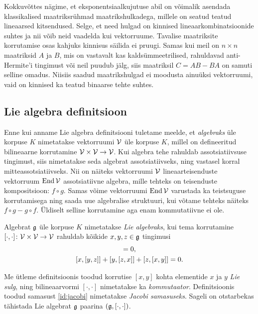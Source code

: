 Kokkuvõttes nägime, et eksponentsiaalkujutuse abil on võimalik asendada
klassikalised maatriksrühmad maatrikshulkadega, millele on seatud
teatud lineaarsed kitsendused. Selge, et need hulgad on kinnised
lineaarkombinatsioonide suhtes ja nii võib neid vaadelda kui vektorruume.
Tavalise maatriksite korrutamise osas kahjuks kinnisus säilida ei
pruugi. Samas kui meil on $n \times n$ maatriksid $A$ ja $B$, mis on vastavalt
kas kaldsümmeetrilised, rahuldavad anti-Hermite'i tingimust või neil
puudub jälg, siis maatriksil $C = AB - BA$ on samuti selline omadus.
Niisiis saadud maatrikshulgad ei moodusta ainuüksi vektorruumi,
vaid on kinnised ka teatud binaarse tehte suhtes.

\subsection{Lie algebra definitsioon}

Enne kui anname Lie algebra definitsiooni tuletame meelde, et \emph{algebraks}
üle korpuse $K$ nimetatakse vektorruumi $\mathcal{V}$ üle korpuse $K$, millel on
defineeritud bilineaarne korrutamine $\mathcal{V} \times \mathcal{V} \to \mathcal{V}$. Kui algebra
tehe rahuldab assotsiatiivsuse tingimust, siis nimetatakse seda algebrat
assotsiatiivseks, ning vastasel korral mitteassotsiatiivseks. Nii on näiteks
vektorruumi $\mathcal{V}$ lineaarteisenduste vektorruum $\operatorname{End} \mathcal{V}$ assotsiatiivne
algebra, mille tehteks on teisenduste kompositsioon: $f \circ g$. Samas võime
vektorruumi $\operatorname{End} \mathcal{V}$ varustada ka teistsuguse korrutamisega ning saada uue
algebralise struktuuri, kui võtame tehteks näiteks $f \circ g - g \circ f$.
Üldiselt selline korrutamine aga enam kommutatiivne ei ole.

\begin{dfn}\label{def:lie-algebra}
    Algebrat $\mathfrak{g}$ üle korpuse $K$ nimetatakse \emph{Lie algebraks}, kui
    tema korrutamine $[\cdot, \cdot] \colon \mathcal{V} \times \mathcal{V} \to \mathcal{V}$ rahuldab
    kõikide $x, y, z \in \mathfrak{g}$ tingimusi
    \begin{gather}
        [x, x] = 0,\label{id:bracket-antisymm} \\
        \brac{x}{\brac{y}{z}} + \brac{y}{\brac{z}{x}} +
            \brac{z}{\brac{x}{y}} = 0.\label{id:jacobi}
    \end{gather}
\end{dfn}


Me ütleme definitsioonis toodud korrutise $[x, y]$ kohta elementide $x$ ja
$y$ \emph{Lie sulg}, ning bilineaarvormi $[\cdot, \cdot]$ nimetatakse ka
\emph{kommutaator}. Definitsioonis toodud samasust \eqref{id:jacobi}
nimetatakse \emph{Jacobi samasuseks}. Sageli on otstarbekas tähistada Lie
algebrat $\mathfrak{g}$ paarina $(\mathfrak{g}, [\cdot, \cdot])$.

